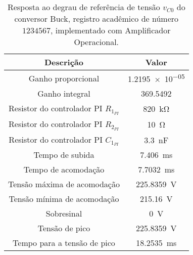 \begin{table}[!ht]
\centering
\caption{Resposta ao degrau de referência de tensão $v_{C0}$ do conversor Buck, registro acadêmico de número $1234567$, implementado com Amplificador Operacional.}
\label{tab:resposta1malhaAmpOp}
\begin{tabular}{@{}cc@{}}
\toprule
\textbf{Descrição} & \textbf{Valor}\\ \midrule
Ganho proporcional & \SI{1.2195e-05}{}\\
Ganho integral & \SI{369.5492}{}\\
Resistor do controlador PI $R_{1_{PI}}$ & \SI{820}{\kilo\ohm}\\
Resistor do controlador PI $R_{2_{PI}}$ & \SI{10}{\ohm}\\
Resistor do controlador PI $C_{1_{PI}}$ & \SI{3.3}{\nano\F}\\
Tempo de subida & \SI{7.406}{\milli\s}\\
Tempo de acomodação & \SI{7.7032}{\milli\s}\\
Tensão máxima de acomodação & \SI{225.8359}{\V}\\
Tensão mínima de acomodação & \SI{215.16}{\V}\\
Sobresinal & \SI{0}{\V}\\
Tensão de pico & \SI{225.8359}{\V}\\
Tempo para a tensão de pico & \SI{18.2535}{\milli\s}\\
\bottomrule
\end{tabular}
\end{table}

